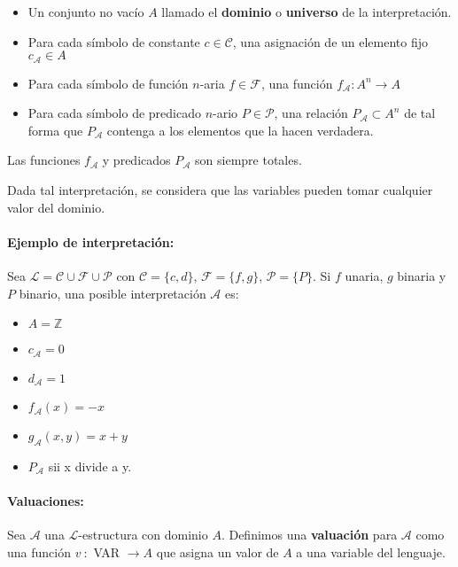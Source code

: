 \begin{itemize}
	\item Un conjunto no vacío $A$ llamado el \textbf{dominio} o \textbf{universo} de la interpretación.
	\item Para cada símbolo de constante $c\in\mathcal{C}$, una asignación de un elemento fijo $c_\mathcal{A} \in A$
	\item Para cada símbolo de función $n$-aria $f\in\mathcal{F}$, una función $f_\mathcal{A}:A^n\to A$
	\item Para cada símbolo de predicado $n$-ario $P\in\mathcal{P}$, una relación $P_\mathcal{A}\subset A^n$ de tal forma que $P_\mathcal{A}$ contenga a los elementos que la hacen verdadera.
\end{itemize}

Las funciones $f_\mathcal{A}$ y predicados $P_\mathcal{A}$ son siempre totales.

Dada tal interpretación, se considera que las variables pueden tomar cualquier valor del dominio.

\paragraph{Ejemplo de interpretación:} Sea $\mathcal{L} = \mathcal{C}\cup\mathcal{F}\cup\mathcal{P}$ con $\mathcal{C}=\{c,d\}$, $\mathcal{F}=\{f,g\}$, $\mathcal{P}=\{P\}$. Si $f$ unaria, $g$ binaria y $P$ binario, una posible interpretación $\mathcal{A}$ es:
\begin{multicols}{2}
\begin{itemize}
	\item[] $A = \mathbb{Z}$
	\item[] $c_\mathcal{A} = 0$
	\item[] $d_\mathcal{A} = 1$
	\item[] $f_\mathcal{A}(x) = -x$
	\item[] $g_\mathcal{A}(x,y) = x + y$
	\item[] $P_\mathcal{A}$ sii x divide a y.
\end{itemize}
\end{multicols}


\paragraph{Valuaciones:} Sea $\mathcal{A}$ una $\mathcal{L}$-estructura con dominio $A$. Definimos una \textbf{valuación} para $\mathcal{A}$ como una función $v~:$ VAR $\to A$  que asigna un valor de $A$ a una variable del lenguaje. 

